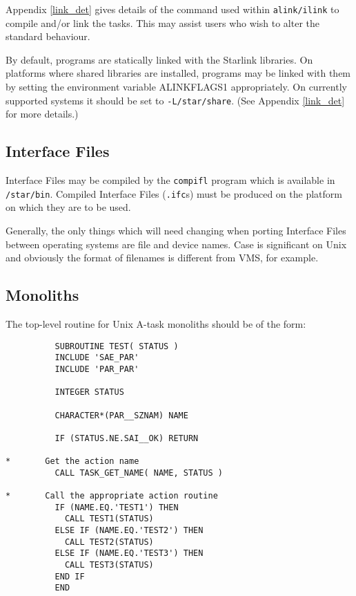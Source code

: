 \documentclass[twoside,11pt]{article}
\newcommand{\xlabel}[1]{}
\renewcommand{\_}{\texttt{\symbol{95}}}
\begin{document}
Appendix \ref{link_det} gives details of the command used within 
\texttt{alink/ilink} to compile and/or link the tasks. 
This may assist users who wish to alter the standard behaviour.

By default, programs are statically linked with the Starlink libraries. 
On platforms where shared libraries are installed, programs may be linked with 
them by setting the environment variable ALINK\_FLAGS1 appropriately.
On currently supported systems it should be set to \texttt{-L/star/share}.
(See Appendix \ref{link_det} for more details.)

\subsection{\xlabel{interface_files}Interface Files}
Interface Files may be compiled by the \texttt{compifl} program which is 
available in \texttt{/star/bin}. 
Compiled Interface Files (\texttt{.ifc}s) must be produced on the platform on 
which they are to be used.

Generally, the only things which will need changing when porting Interface
Files between operating systems are file and device names.
Case is significant on Unix and obviously the format of filenames is different
from VMS, for example.

\subsection{\xlabel{monoliths}\label{ADAM_monoliths}Monoliths}
The top-level routine for Unix A-task monoliths should be of the form:
\begin{small}
\begin{verbatim}
          SUBROUTINE TEST( STATUS )
          INCLUDE 'SAE_PAR'
          INCLUDE 'PAR_PAR'

          INTEGER STATUS

          CHARACTER*(PAR__SZNAM) NAME

          IF (STATUS.NE.SAI__OK) RETURN

*       Get the action name
          CALL TASK_GET_NAME( NAME, STATUS )

*       Call the appropriate action routine
          IF (NAME.EQ.'TEST1') THEN
            CALL TEST1(STATUS)
          ELSE IF (NAME.EQ.'TEST2') THEN
            CALL TEST2(STATUS)
          ELSE IF (NAME.EQ.'TEST3') THEN
            CALL TEST3(STATUS)
          END IF
          END
\end{verbatim}
\end{small}
\end{document}
